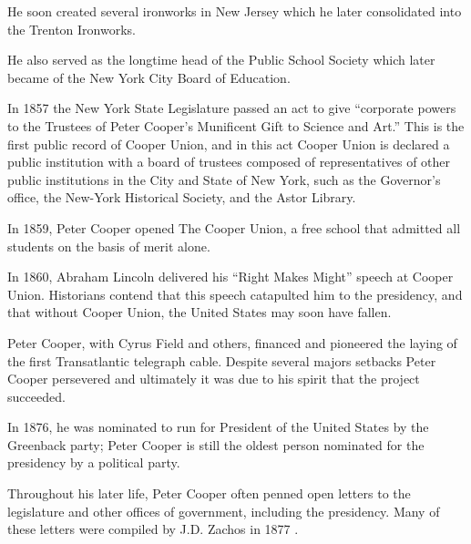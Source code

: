 \documentclass{article}
\begin{document}
\begin{minipage}[t]{0.46\linewidth}
\fontsize{11pt}{13pt}\selectfont
\raggedright
\upshape
\begin{enumList}
\setcounter{enumListi}{\value{enumTemp}}

\item He soon created several ironworks in New Jersey which he later
consolidated into the {\mdseries Trenton Ironworks}.

\item He also served as the longtime {\mdseries head of the Public School
Society} which later became of the New York City Board of Education.

\item In 1857 the New York State Legislature passed an act to give ``corporate
powers to the Trustees of Peter Cooper's Munificent Gift to Science and Art.''
This is the first public record of Cooper Union, and in this act Cooper Union
is declared a {\mdseries public institution with a board of trustees composed
of representatives of other public institutions in the City and State of New
York}, such as the Governor's office, the New-York Historical Society, and the
Astor Library.

\item In 1859, Peter Cooper opened The Cooper Union, a {\mdseries free school
that admitted all students on the basis of merit alone.}

\item In 1860, {\mdseries Abraham Lincoln} delivered his {\mdseries ``Right
Makes Might''} speech at Cooper Union. Historians contend that this speech
catapulted him to the presidency, and that {\mdseries without Cooper Union,
the United States may soon have fallen.}

\item Peter Cooper, with Cyrus Field and others, financed and pioneered the
laying of the {\mdseries first Transatlantic telegraph cable}. Despite several
majors setbacks Peter Cooper persevered and ultimately it was due to his
spirit that the project succeeded.

\item In 1876, he was {\mdseries nominated to run for President of the United
States} by the Greenback party; Peter Cooper is still the {\mdseries oldest
person} nominated for the presidency by a political party.

\item Throughout his later life, Peter Cooper often penned open letters to the
legislature and other offices of government, including the presidency. Many of
these letters were compiled by J.D. Zachos in 1877 \cite{opinions}.


\end{enumList}
\end{minipage}
\end{document}
